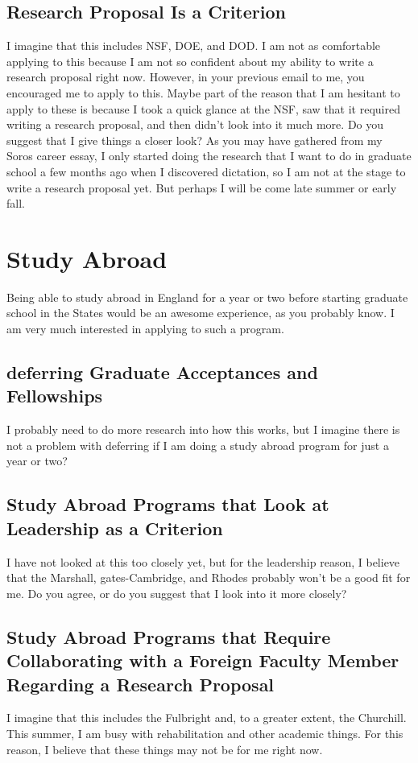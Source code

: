 \documentclass[12pt]{article}
\begin{document}
\subsection{Research Proposal Is a Criterion}
I imagine that this includes NSF, DOE, and DOD. I am not as comfortable applying to this because I am not so confident about my ability to write a research proposal right now. However, in your previous email to me, you encouraged me to apply to this. Maybe part of the reason that I am hesitant to apply to these is because I took a quick glance at the NSF, saw that it required writing a research proposal, and then didn't look into it much more. Do you suggest that I give things a closer look? As you may have gathered from my Soros career essay, I only started doing the research that I want to do in graduate school a few months ago when I discovered dictation, so I am not at the stage to write a research proposal yet. But perhaps I will be come late summer or early fall.

\section{Study Abroad}
Being able to study abroad in England for a year or two before starting graduate school in the States would be an awesome experience, as you probably know. I am very much interested in applying to such a program.

\subsection{deferring Graduate Acceptances and Fellowships}
I probably need to do more research into how this works, but I imagine there is not a problem with deferring if I am doing a study abroad program for just a year or two?

\subsection{Study Abroad Programs that Look at Leadership as a Criterion}
I have not looked at this too closely yet, but for the leadership reason, I believe that the Marshall, gates-Cambridge, and Rhodes probably won't be a good fit for me. Do you agree, or do you suggest that I look into it more closely?

\subsection{Study Abroad Programs that Require Collaborating with a Foreign Faculty Member Regarding a Research Proposal}
I imagine that this includes the Fulbright and, to a greater extent, the Churchill. This summer, I am busy with rehabilitation and other academic things. For this reason, I believe that these things may not be for me right now.
\end{document}
